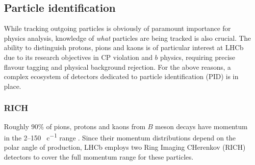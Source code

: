 \subsection{Particle identification}
\label{sec:2:pid}
While tracking outgoing particles is obviously of paramount importance for physics analysis, knowledge of \textit{what} particles are being tracked is also crucial.
The ability to distinguish protons, pions and kaons is of particular interest at LHCb due to its research objectives in CP violation and $b$ physics, requiring precise flavour tagging and physical background rejection.
For the above reasons, a complex ecosystem of detectors dedicated to particle identification (PID) is in place.

\subsubsection{RICH}
Roughly $90\%$ of pions, protons and kaons from $B$ meson decays have momentum in the 2--150 \si{\gev\per c} range \cite{HistoryLHCb}.
Since their momentum distributions depend on the polar angle of production, LHCb employs two Ring Imaging CHerenkov (RICH) detectors \cite{Amato:494263} to cover the full momentum range for these particles.

